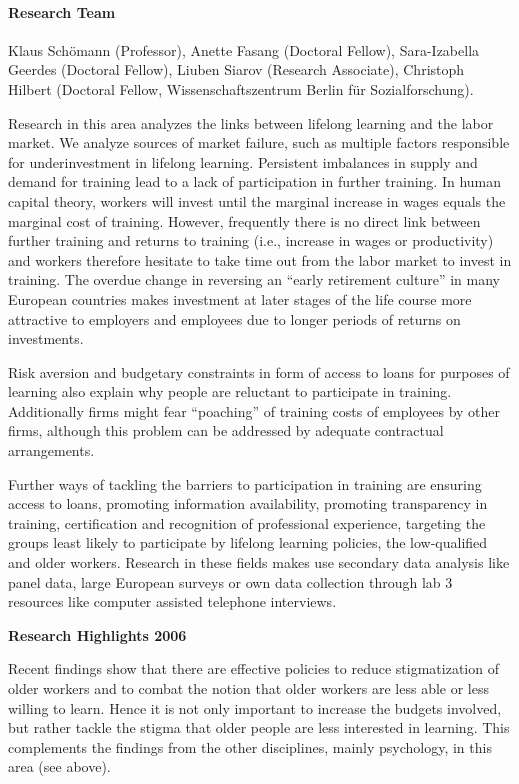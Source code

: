 

\paragraph{Research Team}
Klaus Sch\"{o}mann (Professor), Anette Fasang (Doctoral Fellow), Sara-Izabella Geerdes (Doctoral Fellow), Liuben Siarov (Research Associate), Christoph Hilbert (Doctoral Fellow, Wissenschaftszentrum Berlin f\"{u}r Sozialforschung).

 Research in this area analyzes the links between lifelong learning and the labor market. We analyze sources of market failure, such as multiple factors responsible for underinvestment in lifelong learning. Persistent imbalances in supply and demand for training lead to a lack of participation in further training. In human capital theory, workers will invest until the marginal increase in wages equals the marginal cost of training. However, frequently there is no direct link between further training and returns to training (i.e., increase in wages or productivity) and workers therefore hesitate to take time out from the labor market to invest in training. The overdue change in reversing an ``early retirement culture'' in many European countries makes investment at later stages of the life course more attractive to employers and employees due to longer periods of returns on investments.

 Risk aversion and budgetary constraints in form of access to loans for purposes of learning also explain why people are reluctant to participate in training. Additionally firms might fear ``poaching'' of training costs of employees by other firms, although this problem can be addressed by adequate contractual arrangements.

 Further ways of tackling the barriers to participation in training are ensuring access to loans, promoting information availability, promoting transparency in training, certification and recognition of professional experience, targeting the groups least likely to participate by lifelong learning policies, the low-qualified and older workers. Research in these fields makes use secondary data analysis like panel data, large European surveys or own data collection through lab 3 resources like computer assisted telephone interviews. 

\textbf{Research Highlights 2006}

 Recent findings show that there are effective policies to reduce stigmatization of older workers and to combat the notion that older workers are less able or less willing to learn. Hence it is not only important to increase the budgets involved, but rather tackle the stigma that older people are less interested in learning. This complements the findings from the other disciplines, mainly psychology, in this area (see above).

